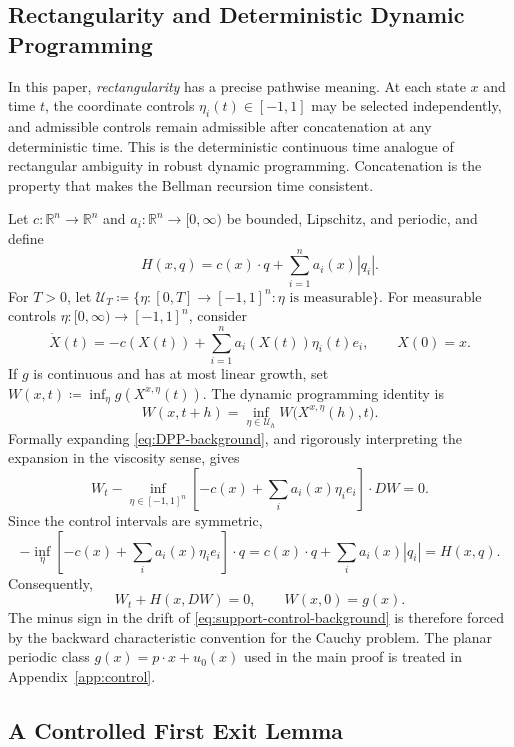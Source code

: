 \documentclass[11pt,reqno,noamsfonts]{amsart}
\theoremstyle{definition}
\theoremstyle{remark}
\newcommand{\R}{\mathbb R}
\begin{document}
\subsection{Rectangularity and Deterministic Dynamic Programming}\label{app:control-background}

In this paper, \emph{rectangularity} has a precise pathwise meaning. At each state $x$ and time $t$, the coordinate controls $\eta_i(t)\in[-1,1]$ may be selected independently, and admissible controls remain admissible after concatenation at any deterministic time. This is the deterministic continuous time analogue of rectangular ambiguity in robust dynamic programming. Concatenation is the property that makes the Bellman recursion time consistent.

Let $c:\R^n\to\R^n$ and $a_i:\R^n\to[0,\infty)$ be bounded, Lipschitz, and periodic, and define
\[
  H(x,q)=c(x)\cdot q+\sum_{i=1}^n a_i(x)|q_i|.
\]
For $T>0$, let
  $\mathcal U_T
  \coloneqq 
  \{
    \eta:[0,T]\to[-1,1]^n :
    \eta \text{ is measurable}
  \}$.
For measurable controls $\eta:[0,\infty)\to[-1,1]^n$, consider
\begin{equation}\label{eq:support-control-background}
  \dot X(t)
  =-c(X(t))+\sum_{i=1}^n a_i(X(t))\eta_i(t)e_i,
  \qquad X(0)=x.
\end{equation}
If $g$ is continuous and has at most linear growth, set $W(x,t)\coloneqq \inf_\eta g(X^{x,\eta}(t))$.
The dynamic programming identity is
\begin{equation}\label{eq:DPP-background}
  W(x,t+h)
  =
  \inf_{\eta\in\mathcal U_h}
  W\bigl(X^{x,\eta}(h),t\bigr).
\end{equation}
Formally expanding \eqref{eq:DPP-background}, and rigorously interpreting the expansion in the viscosity sense, gives
\[
  W_t-\inf_{\eta\in[-1,1]^n}
       \left[-c(x)+\sum_i a_i(x)\eta_i e_i\right]\cdot DW=0.
\]
Since the control intervals are symmetric,
\[
  -\inf_\eta
       \left[-c(x)+\sum_i a_i(x)\eta_i e_i\right]\cdot q
  =c(x)\cdot q+\sum_i a_i(x)|q_i|
  =H(x,q).
\]
Consequently,
\begin{equation*}
  W_t+H(x,DW)=0,
  \qquad W(x,0)=g(x).
\end{equation*}
The minus sign in the drift of \eqref{eq:support-control-background} is therefore forced by the backward characteristic convention for the Cauchy problem. The planar periodic class
$g(x)=p\cdot x+u_0(x)$ used in the main proof is treated in
Appendix~\ref{app:control}.

\subsection{A Controlled First Exit Lemma}\label{app:invariance-background}
\end{document}
